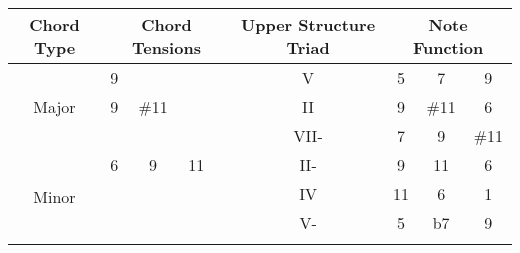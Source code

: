 \documentclass[10pt,a4paper]{article}
\begin{document}
\begin{table}[]
\begin{tabular}{ccccccccc}
\hline
\multicolumn{1}{|c|}{Chord Type}                       & \multicolumn{4}{c|}{Chord Tensions}                                                                      & \multicolumn{1}{c|}{Upper Structure Triad} & \multicolumn{3}{c|}{Note Function}                                               \\ \hline
\multicolumn{1}{|c|}{\multirow{3}{*}{Major}}           & \multicolumn{1}{c|}{9}  & \multicolumn{1}{c|}{}     & \multicolumn{1}{c|}{}   & \multicolumn{1}{c|}{}    & \multicolumn{1}{c|}{V}                     & \multicolumn{1}{c|}{5}   & \multicolumn{1}{c|}{7}    & \multicolumn{1}{c|}{9}    \\ \cline{2-9} 
\multicolumn{1}{|c|}{}                                 & \multicolumn{1}{c|}{9}  & \multicolumn{1}{c|}{\#11} & \multicolumn{1}{c|}{}   & \multicolumn{1}{c|}{}    & \multicolumn{1}{c|}{II}                    & \multicolumn{1}{c|}{9}   & \multicolumn{1}{c|}{\#11} & \multicolumn{1}{c|}{6}    \\ \cline{2-9} 
\multicolumn{1}{|c|}{}                                 & \multicolumn{1}{c|}{}   & \multicolumn{1}{c|}{}     & \multicolumn{1}{c|}{}   & \multicolumn{1}{c|}{}    & \multicolumn{1}{c|}{VII-}                  & \multicolumn{1}{c|}{7}   & \multicolumn{1}{c|}{9}    & \multicolumn{1}{c|}{\#11} \\ \hline
\multicolumn{1}{|c|}{\multirow{4}{*}{Minor}}           & \multicolumn{1}{c|}{6}  & \multicolumn{1}{c|}{9}    & \multicolumn{1}{c|}{11} & \multicolumn{1}{c|}{}    & \multicolumn{1}{c|}{II-}                   & \multicolumn{1}{c|}{9}   & \multicolumn{1}{c|}{11}   & \multicolumn{1}{c|}{6}    \\ \cline{2-9} 
\multicolumn{1}{|c|}{}                                 & \multicolumn{1}{c|}{}   & \multicolumn{1}{c|}{}     & \multicolumn{1}{c|}{}   & \multicolumn{1}{c|}{}    & \multicolumn{1}{c|}{IV}                    & \multicolumn{1}{c|}{11}  & \multicolumn{1}{c|}{6}    & \multicolumn{1}{c|}{1}    \\ \cline{2-9} 
\multicolumn{1}{|c|}{}                                 & \multicolumn{1}{c|}{}   & \multicolumn{1}{c|}{}     & \multicolumn{1}{c|}{}   & \multicolumn{1}{c|}{}    & \multicolumn{1}{c|}{V-}                    & \multicolumn{1}{c|}{5}   & \multicolumn{1}{c|}{b7}   & \multicolumn{1}{c|}{9}    \\ \cline{2-9} 

\end{tabular}
\end{table}
\end{document}

